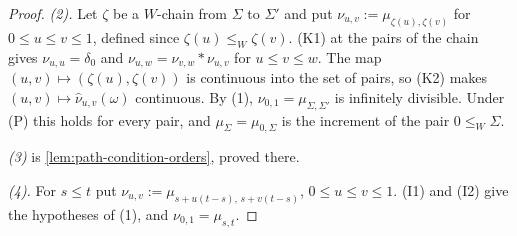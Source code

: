 \begin{proof}
\emph{(2).} Let $\zeta$ be a $W$-chain from $\Sigma$ to $\Sigma'$ and put
$\nu_{u,v} := \mu_{\zeta(u),\zeta(v)}$ for $0 \le u \le v \le 1$, defined since $\zeta(u) \le_W
\zeta(v)$. (K1) at the pairs of the chain gives $\nu_{u,u} = \delta_0$ and $\nu_{u,w} = \nu_{v,w} *
\nu_{u,v}$ for $u \le v \le w$. The map $(u,v) \mapsto (\zeta(u), \zeta(v))$ is continuous into the
set of pairs, so (K2) makes $(u,v) \mapsto \widehat\nu_{u,v}(\omega)$ continuous. By (1),
$\nu_{0,1} = \mu_{\Sigma,\Sigma'}$ is infinitely divisible. Under (P) this holds for every pair, and
$\mu_\Sigma = \mu_{0,\Sigma}$ is the increment of the pair $0 \le_W \Sigma$.

\emph{(3)} is \ref{lem:path-condition-orders}, proved there.

\emph{(4).} For $s \le t$ put $\nu_{u,v} := \mu_{s + u(t-s),\,s + v(t-s)}$, $0 \le u \le v \le 1$.
(I1) and (I2) give the hypotheses of (1), and $\nu_{0,1} = \mu_{s,t}$.
\end{proof}

